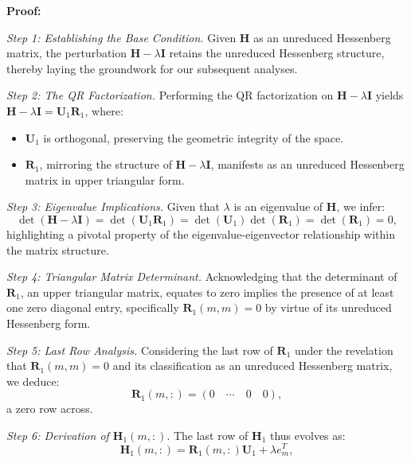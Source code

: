 \documentclass{article}
\begin{document}
\textbf{Proof:}

\textit{Step 1: Establishing the Base Condition.}
Given $\boldsymbol{H}$ as an unreduced Hessenberg matrix, the perturbation $\boldsymbol{H} - \lambda \mathbf{I}$ retains the unreduced Hessenberg structure, thereby laying the groundwork for our subsequent analyses.

\textit{Step 2: The QR Factorization.}
Performing the QR factorization on $\boldsymbol{H} - \lambda \mathbf{I}$ yields $\boldsymbol{H} - \lambda \mathbf{I} = \boldsymbol{U}_1 \boldsymbol{R}_1$, where:
\begin{itemize}
    \item $\boldsymbol{U}_1$ is orthogonal, preserving the geometric integrity of the space.
    \item $\boldsymbol{R}_1$, mirroring the structure of $\boldsymbol{H} - \lambda \mathbf{I}$, manifests as an unreduced Hessenberg matrix in upper triangular form.
\end{itemize}

\textit{Step 3: Eigenvalue Implications.}
Given that $\lambda$ is an eigenvalue of $\boldsymbol{H}$, we infer:
\begin{equation}
\operatorname{det}(\boldsymbol{H} - \lambda \mathbf{I}) = \operatorname{det}(\boldsymbol{U}_1 \boldsymbol{R}_1) = \operatorname{det}(\boldsymbol{U}_1) \operatorname{det}(\boldsymbol{R}_1) = \operatorname{det}(\boldsymbol{R}_1) = 0,
\end{equation}
highlighting a pivotal property of the eigenvalue-eigenvector relationship within the matrix structure.

\textit{Step 4: Triangular Matrix Determinant.}
Acknowledging that the determinant of $\boldsymbol{R}_1$, an upper triangular matrix, equates to zero implies the presence of at least one zero diagonal entry, specifically $\boldsymbol{R}_1(m, m) = 0$ by virtue of its unreduced Hessenberg form.

\textit{Step 5: Last Row Analysis.}
Considering the last row of $\boldsymbol{R}_1$ under the revelation that $\boldsymbol{R}_1(m, m) = 0$ and its classification as an unreduced Hessenberg matrix, we deduce:
\begin{equation}
\boldsymbol{R}_1(m,:) = \left(0 \quad \cdots \quad 0 \quad 0\right),
\end{equation}
a zero row across.

\textit{Step 6: Derivation of $\boldsymbol{H}_1(m,:)$}.
The last row of $\boldsymbol{H}_1$ thus evolves as:
\begin{equation}
\boldsymbol{H}_1(m,:) = \boldsymbol{R}_1(m,:) \boldsymbol{U}_1 + \lambda e_m^T,
\end{equation}
\end{document}
